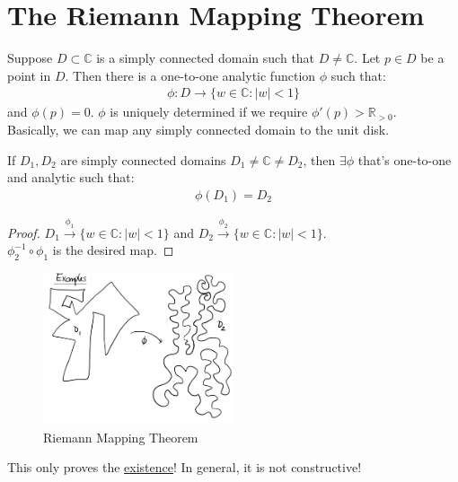 \section{The Riemann Mapping Theorem}

\begin{theorem}
    Suppose $D \subset \mathbb{C}$ is a simply connected domain such that $D \neq \mathbb{C}$. Let $p \in D$ be a point in $D$. Then there is a one-to-one analytic function $\phi$ such that:
    \begin{align*}
        \phi : D \to \{w \in \mathbb{C} : |w| < 1\}
    \end{align*}
    and $\phi(p) = 0$. $\phi$ is uniquely determined if we require $\phi'(p) > \mathbb{R}_{> 0}$.\\
    Basically, we can map any simply connected domain to the unit disk.
\end{theorem}

\begin{corollary}
    If $D_1, D_2$ are simply connected domains $D_1 \neq \mathbb{C} \neq D_2$, then $\exists \phi$ that's one-to-one and analytic such that:
    \begin{align*}
        \phi(D_1) = D_2
    \end{align*}
\end{corollary}

\begin{proof}
    $D_1 \xrightarrow{\phi_1} \{w \in \mathbb{C} : |w| < 1\}$ and $D_2 \xrightarrow{\phi_2} \{w \in \mathbb{C} : |w| < 1\}$.\\
    $\phi_2^{-1} \circ \phi_1$ is the desired map.
\end{proof}

\begin{figure}[H]
    \centering
    \includegraphics[width=0.5\textwidth]{LECTURE_17/graph3.png}
    \caption{Riemann Mapping Theorem}
\end{figure}
\begin{remark}
    This only proves the \underline{existence}! In general, it is not constructive!
\end{remark}

